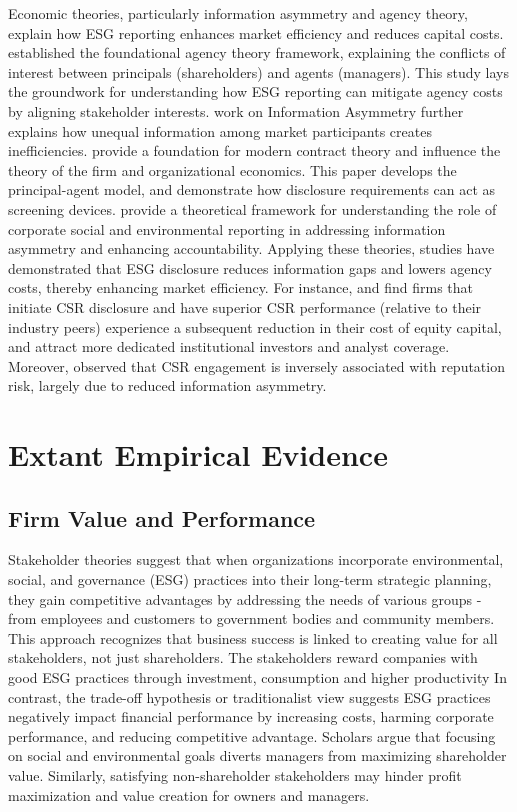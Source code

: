 \documentclass[
  authoryear]{elsarticle}
\begin{document}
Economic theories, particularly information asymmetry and agency theory,
explain how ESG reporting enhances market efficiency and reduces capital
costs. \citet{JENSEN1976} established the foundational agency theory
framework, explaining the conflicts of interest between principals
(shareholders) and agents (managers). This study lays the groundwork for
understanding how ESG reporting can mitigate agency costs by aligning
stakeholder interests. \citet{AKERLOF1970} work on Information Asymmetry
further explains how unequal information among market participants
creates inefficiencies. \citet{HART1987} provide a foundation for modern
contract theory and influence the theory of the firm and organizational
economics. This paper develops the principal-agent model, and
demonstrate how disclosure requirements can act as screening devices.
\citet{GRAY1996} provide a theoretical framework for understanding the
role of corporate social and environmental reporting in addressing
information asymmetry and enhancing accountability. Applying these
theories, studies have demonstrated that ESG disclosure reduces
information gaps and lowers agency costs, thereby enhancing market
efficiency. For instance, \citet{DHALIWAL2011} and \citet{ELGHOUL2011}
find firms that initiate CSR disclosure and have superior CSR
performance (relative to their industry peers) experience a subsequent
reduction in their cost of equity capital, and attract more dedicated
institutional investors and analyst coverage. Moreover, \citet{CUI2018}
observed that CSR engagement is inversely associated with reputation
risk, largely due to reduced information asymmetry.

\section{Extant Empirical Evidence}\label{extant-empirical-evidence}

\subsection{Firm Value and
Performance}\label{firm-value-and-performance}

Stakeholder theories \citep[see][]{FREEMAN1984, DEEGAN2002} suggest that
when organizations incorporate environmental, social, and governance
(ESG) practices into their long-term strategic planning, they gain
competitive advantages by addressing the needs of various groups - from
employees and customers to government bodies and community members. This
approach recognizes that business success is linked to creating value
for all stakeholders, not just shareholders. The stakeholders reward
companies with good ESG practices through investment, consumption and
higher productivity \citep{LI2018}In contrast, the trade-off hypothesis
or traditionalist view \citep[see][]{FRIEDMAN2007} suggests ESG
practices negatively impact financial performance by increasing costs,
harming corporate performance, and reducing competitive advantage.
Scholars argue that focusing on social and environmental goals diverts
managers from maximizing shareholder value. Similarly, satisfying
non-shareholder stakeholders may hinder profit maximization and value
creation for owners and managers\citep{GALANT2017}.
\end{document}

